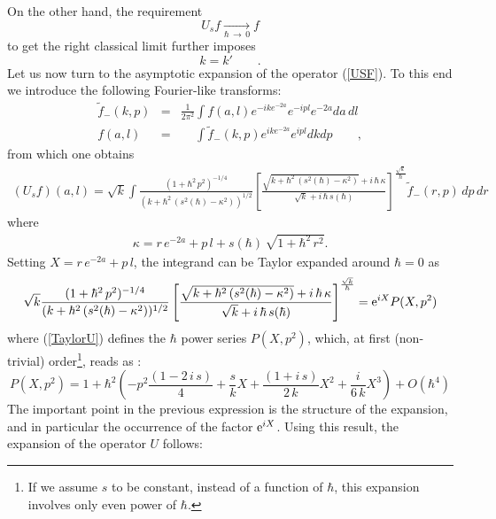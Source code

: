 \documentclass{article}
\def \ra{{\, \rightarrow \,}}
\def \lra{{\longrightarrow}}
\newcommand{\re}[1]{(\ref{#1})}
\begin{document}
\noindent On the other hand, the requirement 
\begin{equation}
   U_s f \underset{\hbar \ra 0}{\lra} f
\end{equation}
to get the right classical limit further imposes
\begin{equation}\label{kmu}
 k = k' \qquad .
\end{equation}
Let us now turn to the asymptotic expansion of the operator  \re{USF}. To this end we introduce the following Fourier-like transforms:
\begin{eqnarray}
 \tilde{f}_- (k,p) &=& \frac{1}{2\pi^2} \int f(a,l) e^{-i k e^{-2a}} e^{-ipl} e^{-2a} da\, dl \label{Fouriermoins}\\
  f(a,l) &=& \phantom{\frac{1}{2\pi^2}}\int \tilde{f}_- (k,p) e^{i k e^{-2a}} e^{i p l} dk dp\qquad ,
\end{eqnarray}
from which one obtains
\begin{eqnarray}\label{UsDev}
 (U_s f) (a,l) =\sqrt{k}\int \frac{(1+\hbar^2\, p^2)^{-1/4}}{(k + \hbar^2\,(s^2(\hbar) - \kappa^2))^{1/2}} \left[\frac{\sqrt{k + \hbar^2 \,(s^2(\hbar) - \kappa^2)} + i \,\hbar\,\kappa }{\sqrt{k} +  i \, \hbar\, s(\hbar)} \right]^{\frac{\sqrt{k}}{ \hbar}}  \tilde{f}_- (r,p)\,dp\,dr
\end{eqnarray}
where 
\begin{eqnarray}
 \kappa = r\, e^{-2a} + p\, l  + s(\hbar)\, \sqrt{1+\hbar^2\,r^2}.
\end{eqnarray}
Setting $X = r\, e^{-2a} + p\, l$, the integrand can be Taylor expanded around $\hbar = 0$ as 
\begin{equation}\label{TaylorU}
 \sqrt{k}  \frac{(1+\hbar^2\, p^2)^{-1/4}}{(k + \hbar^2\,(s^2(\hbar) - \kappa^2))^{1/2}} \left[\frac{\sqrt{k + \hbar^2 \,(s^2(\hbar) - \kappa^2)} + i \,\hbar\,\kappa }{\sqrt{k} +  i \,\hbar\, s(\hbar)} \right]^{\frac{\sqrt{k}}{ \hbar}}= {\rm e}^{i X} P(X,p^2)
\end{equation}
where \re{TaylorU} defines the $\hbar$ power series  $P(X,p^2)$,  which, at first (non-trivial) order\footnote{If we assume $s$ to be constant, instead of a function of $\hbar$, this expansion involves only even power of $\hbar$.}, reads as :
\begin{equation}\label{P}
 P(X,p^2) = 1 + \hbar^2 \left(-p^2\frac{ (1-2\,i\, s)}4 + \frac{ s}{k} X +  \frac{(1+ i\, s)}{2\,k} X^2 +  \frac{i}{6\, k}X^3\right) + O(\hbar^4) 
\end{equation}
The important point in the previous expression is the structure of the expansion, and in particular the occurrence of the factor $ {\rm e}^{i X}$. Using this result, the expansion of the operator $U$ follows:
\end{document}
